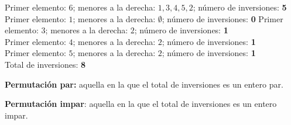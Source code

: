 Primer elemento: $6$; menores a la derecha: $1,3,4,5,2$; n\'umero de
inversiones: \textbf{5}
Primer elemento: $1$; menores a la derecha: $\emptyset$; n\'umero de
inversiones: \textbf{0}
Primer elemento: $3$; menores a la derecha: $2$; n\'umero de inversiones:
\textbf{1}\\
Primer elemento: $4$; menores a la derecha: $2$; n\'umero de inversiones:
\textbf{1}\\
Primer elemento: $5$; menores a la derecha: $2$; n\'umero de inversiones:
\textbf{1}\\

Total de inversiones: \textbf{8}
\begin{tcolorbox}[colback=gray!5!white,colframe=gray!60!black,title=Definición: Tipos de permutaciones]
	\textbf{Permutaci\'on par:} aquella en la que el total de inversiones es un
	entero par.
	
	\tcblower

	\textbf{Permutaci\'on impar}: aquella en la que el total de inversiones es un
	entero impar.
	
\end{tcolorbox}
